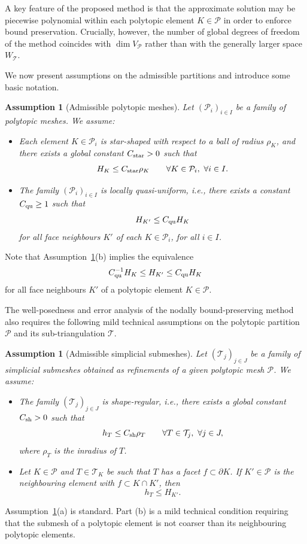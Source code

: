 \documentclass[11pt,final]{amsart}
\theoremstyle{plain}
\newtheorem{assumption}[theorem]{Assumption}
\theoremstyle{definition}
\newcommand\calP{{\mathcal{P}}}
\newcommand\calT{{\mathcal{T}}}
\newcommand{\mesh}{\calP}
\begin{document}
A key feature of the proposed method is that the approximate solution
may be piecewise polynomial within each polytopic element $K \in
\calP$ in order to enforce bound preservation. Crucially, however, the
number of global degrees of freedom of the method coincides with $\dim
V_\calP$ rather than with the generally larger space $W_\calT$.
  
We now present assumptions on the admissible partitions and introduce some basic notation.

\begin{assumption}[Admissible polytopic meshes]\label{mesh_assumption}
  Let $({\mesh_i})_{i\in I}$ be a family of polytopic meshes. We assume:
  \begin{itemize}
  \item[(a)] Each element $K \in \mesh_i$ is star-shaped with respect
    to a ball of radius $\rho_K$, and there exists a global constant
    $C_{\rm star}>0$ such that
  \[
  H_K \le C_{\rm star} \rho_K \qquad \forall K \in \mesh_i, \ \forall i \in I.
  \]
\item[(b)] The family $({\mesh_i})_{i\in I}$ is locally quasi-uniform,
  i.e., there exists a constant $C_{\rm qu} \ge 1$ such that
  \[
  H_{K'} \le C_{\rm qu} H_K
  \]
  for all face neighbours $K'$ of each $K \in \mesh_i$, for all $i \in
  I$.
\end{itemize}
\end{assumption}

Note that Assumption~\ref{mesh_assumption}(b) implies the equivalence
\[
C_{\rm qu}^{-1} H_K  \le  H_{K'}  \le  C_{\rm qu} H_K
\]
for all face neighbours $K'$ of a polytopic element $K \in \mesh$.

The well-posedness and error analysis of the nodally bound-preserving
method also requires the following mild technical assumptions on the
polytopic partition $\calP$ and its sub-triangulation $\calT$.

\begin{assumption}[Admissible simplicial submeshes]\label{mesh_assumption_two}
  Let $({\calT_j})_{j\in J}$ be a family of simplicial submeshes
  obtained as refinements of a given polytopic mesh $\calP$. We
  assume:
\begin{itemize}
\item[(a)] The family $({\calT_j})_{j\in J}$ is shape-regular, i.e.,
  there exists a global constant $C_{\rm sh}>0$ such that
  \[
  h_T \le C_{\rm sh} \rho_T \qquad \forall T \in \calT_j, \ \forall j \in J,
  \]
  where $\rho_T$ is the inradius of $T$.
  \item[(b)] Let $K \in \calP$ and $T \in \calT_K$ be such that $T$
    has a facet $f \subset \partial K$. If $K' \in \calP$ is the
    neighbouring element with $f \subset K \cap K'$, then
  \[
  h_T \le H_{K'}.
  \]
\end{itemize}
\end{assumption}
Assumption~\ref{mesh_assumption_two}(a) is standard. Part (b) is a
mild technical condition requiring that the submesh of a polytopic
element is not coarser than its neighbouring polytopic elements.
 
\end{document}
